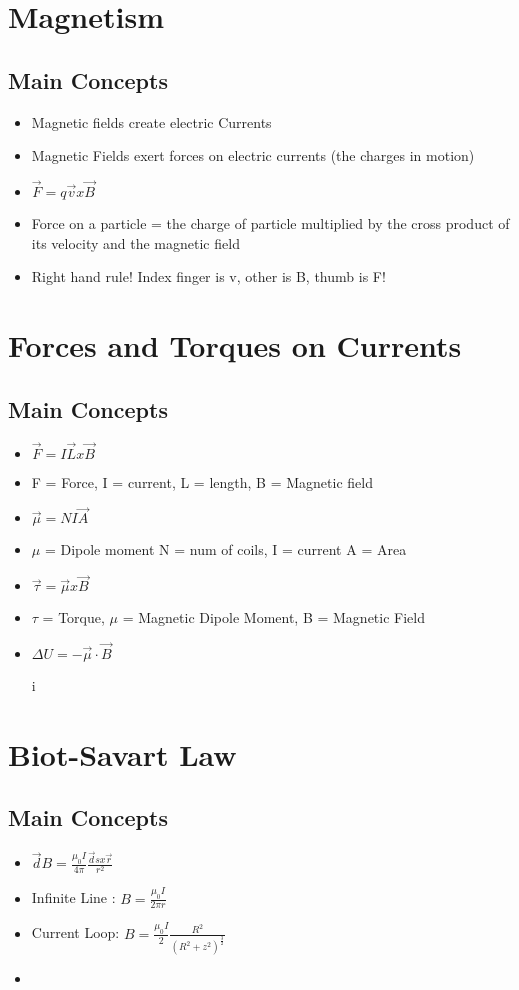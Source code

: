 \documentclass{article}
\begin{document}
\section{Magnetism}
\subsection{Main Concepts}
\begin{itemize}
	\item Magnetic fields create electric Currents
	\item Magnetic Fields exert forces on electric currents (the charges in motion)
	\item $\vec F = q \vec v x \vec B$
	\item Force on a particle  = the charge of particle multiplied by the cross product of its velocity and the magnetic field
	\item Right hand rule! Index finger is v, other is B, thumb is F!
\end{itemize}

\section{Forces and Torques on Currents}
\subsection{Main Concepts}
\begin{itemize}
	\item $\vec F = I \vec L x \vec B$
	\item F = Force, I = current, L = length, B = Magnetic field
	\item $\vec \mu = NI \vec A$
	\item $\mu$ = Dipole moment N = num of coils, I = current A = Area 
	\item $\vec\tau = \vec\mu x \vec B $
	\item $\tau$ = Torque, $\mu$ = Magnetic Dipole Moment, B = Magnetic Field
	\item $\Delta U = -\vec\mu\cdot\vec B$

	i 
\end{itemize}
\section{Biot-Savart Law}
\subsection{Main Concepts}
\begin{itemize}
	\item $\vec dB = \frac{\mu_0 I}{4 \pi} \frac{\vec ds x \vec r}{r^2}$
	\item \vec Infinite Line : $B= \frac{\mu_0 I}{2 \pi r}$
	\item Current Loop: $ B = \frac{\mu_0 I }{2} \frac{R^2}{(R^2 + z^2)^\frac{3}{2}}$
	\item 
\end{itemize}
\end{document}
